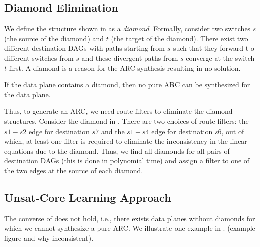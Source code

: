 \subsection{Diamond Elimination}
We define the structure shown in 
as a \emph{diamond}. Formally,
consider two switches $s$ (the source of the diamond) 
and $t$ (the target of the diamond).
There exist two different destination DAGs with 
paths starting from $s$ such that they forward t
o different switches from $s$  
and these divergent paths from $s$ converge
at the switch $t$ first. A diamond is 
a reason for the ARC synthesis resulting in no
solution. 
\begin{theorem} \label{thm:diamond}
If the data plane contains a diamond, then no pure ARC  
can be synthesized for the data plane.
\end{theorem}
Thus, to generate an ARC, we need route-filters
to eliminate the diamond structures. Consider
the diamond in . There are two choices
of route-filters: the $s1-s2$ edge for destination $s7$ 
and the $s1-s4$ edge for destination $s6$, out of which,
at least one filter is required to eliminate the 
inconsistency in the linear equations due to the diamond.
Thus, we find all diamonds for all pairs of destination
DAGs (this is done in polynomial time) and assign a filter
to one of the two edges at the source of each diamond. 

\subsection{Unsat-Core Learning Approach}
The converse of  does not hold, i.e.,
there exists data planes without diamonds for which
we cannot synthesize a pure ARC. We illustrate one example
in \Cref{}. (example figure and why inconsistent).

